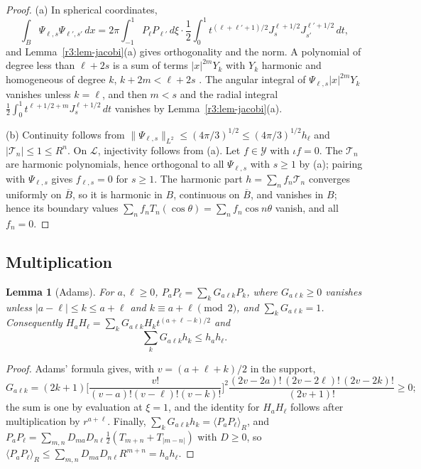 \documentclass[11pt]{amsart}
\newtheorem{lemma}[theorem]{Lemma}
\theoremstyle{definition}
\theoremstyle{remark}
\numberwithin{equation}{section}
\newcommand{\nrm}[1]{\lVert #1\rVert}
\begin{document}
\begin{proof}
(a) In spherical coordinates,
\[
\int_B\Psi_{\ell,s}\Psi_{\ell',s'}\,dx=2\pi\int_{-1}^1P_\ell P_{\ell'}\,d\xi\cdot\frac12\int_0^1t^{(\ell+\ell'+1)/2}J^{\ell+1/2}_sJ^{\ell'+1/2}_{s'}\,dt,
\]
and Lemma~\ref{r3:lem-jacobi}(a) gives orthogonality and the norm. A polynomial of degree less than $\ell+2s$ is a sum of terms $|x|^{2m}Y_k$ with $Y_k$ harmonic and homogeneous of degree $k$, $k+2m<\ell+2s$ \cite[Ch.~IV]{SW71}. The angular integral of $\Psi_{\ell,s}|x|^{2m}Y_k$ vanishes unless $k=\ell$, and then $m<s$ and the radial integral $\frac12\int_0^1t^{\ell+1/2+m}J^{\ell+1/2}_s\,dt$ vanishes by Lemma~\ref{r3:lem-jacobi}(a).

(b) Continuity follows from $\nrm{\Psi_{\ell,s}}_{L^2}\leq(4\pi/3)^{1/2}\leq(4\pi/3)^{1/2}h_\ell$ and $|\mathcal T_n|\leq1\leq R^n$. On $\mathcal L$, injectivity follows from (a). Let $f\in\mathcal Y$ with $\iota f=0$. The $\mathcal T_n$ are harmonic polynomials, hence orthogonal to all $\Psi_{\ell,s}$ with $s\geq1$ by (a); pairing with $\Psi_{\ell,s}$ gives $f_{\ell,s}=0$ for $s\geq1$. The harmonic part $h=\sum_nf_n\mathcal T_n$ converges uniformly on $\overline B$, so it is harmonic in $B$, continuous on $\overline B$, and vanishes in $B$; hence its boundary values $\sum_nf_nT_n(\cos\theta)=\sum_nf_n\cos n\theta$ vanish, and all $f_n=0$.
\end{proof}

\subsection{Multiplication}\label{r3:sec-mult}

\begin{lemma}[Adams]\label{r3:lem-gaunt}
For $a,\ell\geq0$, $P_aP_\ell=\sum_kG_{a\ell k}P_k$, where $G_{a\ell k}\geq0$ vanishes unless $|a-\ell|\leq k\leq a+\ell$ and $k\equiv a+\ell\pmod2$, and $\sum_kG_{a\ell k}=1$. Consequently $H_aH_\ell=\sum_kG_{a\ell k}H_kt^{(a+\ell-k)/2}$ and
\[
\sum_kG_{a\ell k}h_k\leq h_ah_\ell .
\]
\end{lemma}

\begin{proof}
Adams' formula \cite{Ada78} gives, with $v=(a+\ell+k)/2$ in the support,
\[
G_{a\ell k}=(2k+1)\Big[\frac{v!}{(v-a)!(v-\ell)!(v-k)!}\Big]^2\frac{(2v-2a)!\,(2v-2\ell)!\,(2v-2k)!}{(2v+1)!}\geq0 ;
\]
the sum is one by evaluation at $\xi=1$, and the identity for $H_aH_\ell$ follows after multiplication by $r^{a+\ell}$. Finally, $\sum_kG_{a\ell k}h_k=\langle P_aP_\ell\rangle_R$, and $P_aP_\ell=\sum_{m,n}D_{ma}D_{n\ell}\frac12(T_{m+n}+T_{|m-n|})$ with $D\geq0$, so $\langle P_aP_\ell\rangle_R\leq\sum_{m,n}D_{ma}D_{n\ell}R^{m+n}=h_ah_\ell$.
\end{proof}
\end{document}
